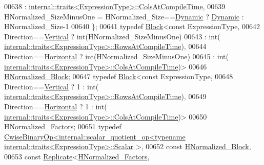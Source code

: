 \begin{DoxyCode}
00638                                              : 
      \hyperlink{struct_eigen_1_1internal_1_1traits}{internal::traits<ExpressionType>::ColsAtCompileTime},
00639       HNormalized\_SizeMinusOne = HNormalized\_Size==\hyperlink{namespace_eigen_ad81fa7195215a0ce30017dfac309f0b2}{Dynamic} ? \hyperlink{namespace_eigen_ad81fa7195215a0ce30017dfac309f0b2}{Dynamic} : HNormalized\_Size-1
00640     \};
00641     \textcolor{keyword}{typedef} \hyperlink{group___core___module_class_eigen_1_1_block}{Block}<\textcolor{keyword}{const} ExpressionType,
00642                   Direction==\hyperlink{group__enums_ggad49a7b3738e273eb00932271b36127f7addca718e0564723df21d61b94b1198be}{Vertical}   ? int(HNormalized\_SizeMinusOne)
00643                                         : int(
      \hyperlink{struct_eigen_1_1internal_1_1traits}{internal::traits<ExpressionType>::RowsAtCompileTime}),
00644                   Direction==\hyperlink{group__enums_ggad49a7b3738e273eb00932271b36127f7aae8a16b3b9272683c1162915f6d892be}{Horizontal} ? int(HNormalized\_SizeMinusOne)
00645                                         : int(
      \hyperlink{struct_eigen_1_1internal_1_1traits}{internal::traits<ExpressionType>::ColsAtCompileTime})>
00646             \hyperlink{group___core___module_class_eigen_1_1_block}{HNormalized\_Block};
00647     \textcolor{keyword}{typedef} \hyperlink{group___core___module_class_eigen_1_1_block}{Block}<\textcolor{keyword}{const} ExpressionType,
00648                   Direction==\hyperlink{group__enums_ggad49a7b3738e273eb00932271b36127f7addca718e0564723df21d61b94b1198be}{Vertical}   ? 1 : int(
      \hyperlink{struct_eigen_1_1internal_1_1traits}{internal::traits<ExpressionType>::RowsAtCompileTime}),
00649                   Direction==\hyperlink{group__enums_ggad49a7b3738e273eb00932271b36127f7aae8a16b3b9272683c1162915f6d892be}{Horizontal} ? 1 : int(
      \hyperlink{struct_eigen_1_1internal_1_1traits}{internal::traits<ExpressionType>::ColsAtCompileTime})>
00650             \hyperlink{group___core___module_class_eigen_1_1_block}{HNormalized\_Factors};
00651     \textcolor{keyword}{typedef} 
      \hyperlink{group___core___module_class_eigen_1_1_cwise_binary_op}{CwiseBinaryOp<internal::scalar\_quotient\_op<typename internal::traits<ExpressionType>::Scalar}
      >,
00652                 \textcolor{keyword}{const} \hyperlink{group___core___module_class_eigen_1_1_block}{HNormalized\_Block},
00653                 \textcolor{keyword}{const} \hyperlink{group___core___module_class_eigen_1_1_replicate}{Replicate}<\hyperlink{group___core___module_class_eigen_1_1_block}{HNormalized\_Factors},

\end{DoxyCode}
